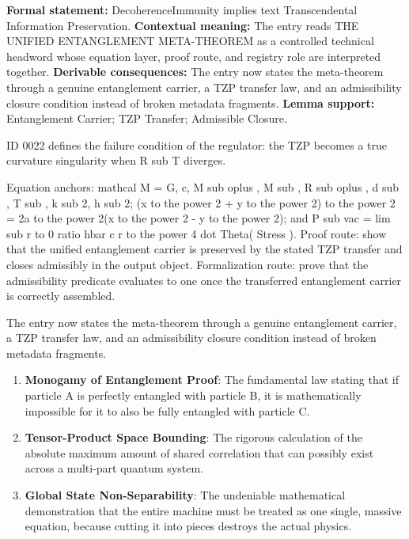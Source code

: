 \begingroup\footnotesize\setlength{\emergencystretch}{3em}\sloppy
\textbf{Formal statement:} DecoherenceImmunity implies text Transcendental Information Preservation. \textbf{Contextual meaning:} The entry reads THE UNIFIED ENTANGLEMENT META-THEOREM as a controlled technical headword whose equation layer, proof route, and registry role are interpreted together. \textbf{Derivable consequences:} The entry now states the meta-theorem through a genuine entanglement carrier, a TZP transfer law, and an admissibility closure condition instead of broken metadata fragments. \textbf{Lemma support:} Entanglement Carrier; TZP Transfer; Admissible Closure.\par
\endgroup

ID 0022 defines the failure condition of the regulator: the TZP becomes a true curvature singularity when R sub T diverges.

Equation anchors: mathcal M = G, c, M sub oplus , M sub   , R sub oplus , d sub   , T sub   , k sub 2, h sub 2; (x to the power 2 + y to the power 2) to the power 2 = 2a to the power 2(x to the power 2 - y to the power 2); and P sub vac = lim sub r to 0 ratio hbar c r to the power 4 dot Theta( Stress ). Proof route: show that the unified entanglement carrier is preserved by the stated TZP transfer and closes admissibly in the output object. Formalization route: prove that the admissibility predicate evaluates to one once the transferred entanglement carrier is correctly assembled.

The entry now states the meta-theorem through a genuine entanglement carrier, a TZP transfer law, and an admissibility closure condition instead of broken metadata fragments.
\endgroup

\begin{enumerate}[leftmargin=1.6em,itemsep=6pt,topsep=4pt]
\item \textbf{Monogamy of Entanglement Proof}: The fundamental law stating that if particle A is perfectly entangled with particle B, it is mathematically impossible for it to also be fully entangled with particle C.
\item \textbf{Tensor-Product Space Bounding}: The rigorous calculation of the absolute maximum amount of shared correlation that can possibly exist across a multi-part quantum system.
\item \textbf{Global State Non-Separability}: The undeniable mathematical demonstration that the entire machine must be treated as one single, massive equation, because cutting it into pieces destroys the actual physics.
\end{enumerate}

